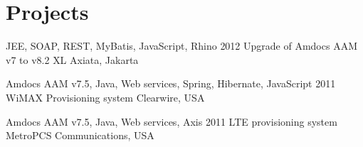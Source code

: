 \documentclass{tccv}
\begin{document}






\section{Projects}

\begin{yearlist}

\item[JEE, SOAP, REST, MyBatis, JavaScript, Rhino]{2012}
     {Upgrade of Amdocs AAM v7 to v8.2}
     {XL Axiata, Jakarta}


\item[Amdocs AAM v7.5, Java, Web services, Spring, Hibernate, JavaScript]{2011}
     {WiMAX Provisioning system}
     {Clearwire, USA}

\item[Amdocs AAM v7.5, Java, Web services, Axis]{2011}
     {LTE provisioning system}
     {MetroPCS Communications, USA}

\end{yearlist}
\end{document}

